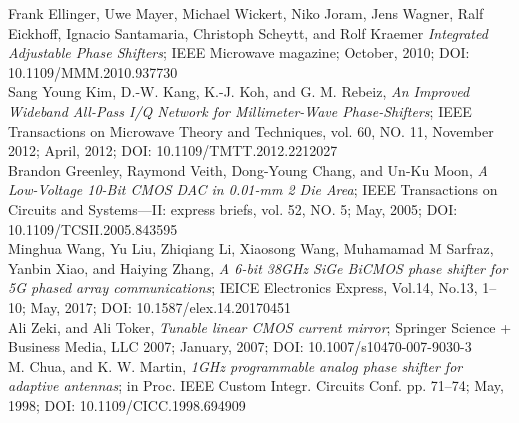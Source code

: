 \documentclass[journal,twocolumn,letterpaper]{IEEEJERM}
\begin{document}
\begin{thebibliography}{9}

	Frank Ellinger, Uwe Mayer, Michael Wickert, Niko Joram, Jens Wagner, Ralf Eickhoff, Ignacio Santamaria, Christoph Scheytt, and Rolf Kraemer
	\textit{Integrated Adjustable Phase Shifters};
	IEEE Microwave magazine;
	October, 2010;
	DOI: 10.1109/MMM.2010.937730 \\

 	Sang Young Kim, D.-W. Kang, K.-J. Koh, and G. M. Rebeiz,
	\textit{An Improved Wideband All-Pass I/Q Network for Millimeter-Wave Phase-Shifters};
	IEEE Transactions on Microwave Theory and Techniques, vol. 60, NO. 11, November 2012;
	April, 2012;
	DOI: 10.1109/TMTT.2012.2212027 \\
    
	Brandon Greenley, Raymond Veith, Dong-Young Chang, and Un-Ku Moon,
	\textit{A Low-Voltage 10-Bit CMOS DAC in 0.01-mm 2 Die Area};
	IEEE Transactions on Circuits and Systems—II: express briefs, vol. 52, NO. 5;
	May, 2005;
  DOI: 10.1109/TCSII.2005.843595 \\

	Minghua Wang, Yu Liu, Zhiqiang Li, Xiaosong Wang, Muhamamad M Sarfraz, Yanbin Xiao, and Haiying Zhang, 
	\textit{A 6-bit 38GHz SiGe BiCMOS phase shifter for 5G phased array communications};
	IEICE Electronics Express, Vol.14, No.13, 1–10;
	May, 2017;
  DOI: 10.1587/elex.14.20170451 \\

	Ali Zeki, and Ali Toker,
	\textit{Tunable linear CMOS current mirror};
	Springer Science + Business Media, LLC 2007;
	January, 2007;
	DOI: 10.1007/s10470-007-9030-3 \\

  M. Chua, and K. W. Martin,
  \textit{1GHz programmable analog phase shifter for adaptive antennas};
  in Proc. IEEE Custom Integr. Circuits Conf. pp. 71–74;
  May, 1998;
  DOI: 10.1109/CICC.1998.694909 \\






    


\end{thebibliography}
\end{document}
